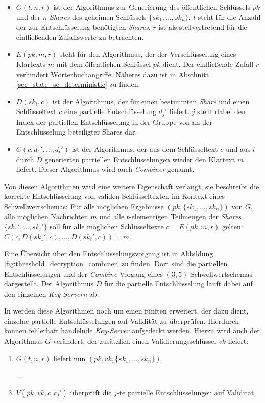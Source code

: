 \begin{itemize}
  \item \(G(t, n, r)\) ist der Algorithmus zur Generierung des öffentlichen Schlüssels \(pk\) und der \(n\) \textit{Shares} des geheimen Schlüssels \(\{sk_1, \dots, sk_n\}\). \(t\) steht für die Anzahl der zur Entschlüsselung benötigten \textit{Shares}. \(r\) ist als stellvertretend für die einfließenden Zufallswerte zu betrachten.
  
  \item \(E(pk, m, r)\) steht für den Algorithmus, der der Verschlüsselung eines Klartexts \(m\) mit dem öffentlichen Schlüssel \(pk\) dient. Der einfließende Zufall \(r\) verhindert Wörterbuchangriffe. Näheres dazu ist in Abschnitt \ref{sec_state_se_deterministic} zu finden.
  
  \item \(D(sk_i, c)\) ist der Algorithmus, der für einen bestimmten \textit{Share} und einen Schlüsseltext \(c\) eine partielle Entschlüsselung \(d_j'\) liefert. \(j\) stellt dabei den Index der partiellen Entschlüsselung in der Gruppe von an der Entschlüsselung beteiligter Shares dar.
  
  \item \(C(c, d_1', \dots, d_t')\) ist der Algorithmus, der aus dem Schlüsseltext \(c\) und aus \(t\) durch \(D\) generierten partiellen Entschlüsselungen wieder den Klartext \(m\) liefert. Dieser Algorithmus wird auch \textit{Combiner} genannt. 
\end{itemize}

Von diesen Algorithmen wird eine weitere Eigenschaft verlangt; sie beschreibt die korrekte Entschlüsselung von validen Schlüsseltexten im Kontext eines Schwellwertschemas: Für alle möglichen Ergebnisse \((pk, \{sk_1, \dots, sk_n\})\) von \(G\), alle möglichen Nachrichten \(m\) und alle \(t\)-elementigen Teilmengen der \textit{Shares} \(\{sk_1', \dots, sk_t'\}\) soll für alle möglichen Schlüsseltexte \(c=E(pk, m, r)\) gelten: \(C(c, D(sk_1', c), \dots, D(sk_t', c)) = m\).

Eine Übersicht über den Entschlüsselungsvorgang ist in Abbildung \ref{fig:threshold_decryption_combiner} zu finden. Dort sind die partiellen Entschlüsselungen und der \textit{Combine}-Vorgang eines \((3,5)\)-Schwellwertschemas dargestellt. Der Algorithmus \(D\) für die partielle Entschlüsselung läuft dabei auf den einzelnen \textit{Key-Servern} ab.

In \cite{boneh2006} werden diese Algorithmen noch um einen fünften erweitert, der dazu dient, einzelne partielle Entschlüsselungen auf Validität zu überprüfen. Hierdurch können fehlerhaft handelnde \textit{Key-Server} aufgedeckt werden. Hierzu wird auch der Algorithmus \(G\) verändert, der zusätzlich einen Validierungsschlüssel \(vk\) liefert:
\begin{enumerate}
	\item \(G(t, n, r)\) liefert nun \((pk, vk, \{sk_1, \dots, sk_n\})\).
  \item[...] 
  \setcounter{enumi}{4}
	\item \(V(pk, vk, c, c_j')\) überprüft die \(j\)-te partielle Entschlüsselungen auf Validität.
\end{enumerate}

